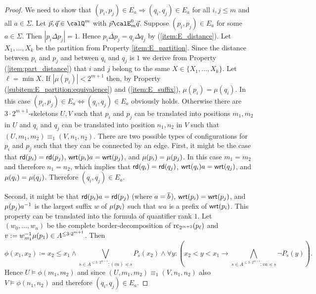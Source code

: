 \begin{proof}
	We need to show that $(p_i,p_j)\in E_a \Rightarrow (q_i,q_j)\in E_a$  for all $i,j\leq m$ and all $a\in \Sigma$.
	Let $\vec{p}, \vec{q} \in \Qx^m$ with $\vec{p} \calE^0_m \vec{q}$. Suppose  $(p_i,p_j) \in E_a$ for some $a\in\Sigma$. Then $|p_i\Delta p_j| = 1$. Hence $p_i\Delta p_j = q_i\Delta q_j$ by (\ref{item:E_distance}). 
	Let $X_1,\ldots, X_k$ be the partition from Property \ref{item:E_partition}. Since the distance between $p_i$ and $p_j$ and between $q_i$ and $q_j$ is $1$ we derive from Property (\ref{item:part_distance}) that $i$ and $j$ belong to the same 
	$X\in\{X_1,\ldots, X_k\}$. Let $\ell = \min X$.
	If $|\mu(p_i)| < 2^{m  +1}$ then, by Property (\ref{subitem:E_partition:equivalence}) and (\ref{item:E_suffix}), $\mu(p_i) = \mu(q_i)$. In this case $(p_i, p_j) \in E_a \Leftrightarrow (q_i,q_j) \in E_a$  obviously holds.
	Otherwise there are $3\cdot2^{m + 1}$-skeletons $U,V$ such that 
	$p_i$ and $p_j$ can be translated into positions $m_1, m_2$ in $U$ and $q_i$ and $q_j$ can be translated into position $n_1,n_2$ in $V$ such that $(U,m_1,m_2) \equiv_1 (V,n_1,n_2)$. 
	There are two possible types of configurations for $p_i$ and $p_j$ such that they can be connected by an edge. First, it might be the case  that $\mathsf{rd}(p_i) = \mathsf{rd}(p_j)$,
	$\mathsf{wrt}(p_i)a = \mathsf{wrt}(p_j)$, and $\mu(p_i) = \mu(p_j)$. In this case $m_1=m_2$ and therefore $n_1=n_2$, which implies that $\mathsf{rd}(q_i) = \mathsf{rd}(q_j)$,
	$\mathsf{wrt}(q_i)a = \mathsf{wrt}(q_j)$, and $\mu(q_i) = \mu(q_j)$. Therefore $(q_i,q_j) \in E_a$.
	
	Second, it might be that $\mathsf{rd}(p_i)a = \mathsf{rd}(p_j)$ (where $a=\overline{b}$),
	$\mathsf{wrt}(p_i) = \mathsf{wrt}(p_j)$, and $\mu(p_j)a^{-1}$ is the largest suffix $w$ of $\mu(p_i)$ such that $wa$ is a prefix of $\mathsf{wrt}(p_i)$.  This property can be translated into the formula of quantifier rank $1$. Let $(w_0,\ldots, w_n)$ be the complete border-decomposition of $\operatorname{rc}_{2^{m+2}}(p_\ell)$ and $v:= w_{m_1}^{-1}\mu(p_1) \in A^{\leq 3\cdot 2^{m+1}}$. Then
	\[\phi(x_1, x_2) \coloneq x_2 \leq x_1 \land \bigvee_{s\in A^{\leq 3\cdot 2^{m+1}} : (va)\preceq s} P_s(x_2) \land  \forall y: \left(x_2 < y < x_1 \to \bigwedge_{s\in A^{\leq 3\cdot 2^{m+1}} : va\preceq s} \lnot P_s(y)\right) . \]
	 Hence $U \models \phi(m_1,m_2)$  and since $(U,m_1,m_2) \equiv_1 (V, n_1,n_2)$ also $V \models \phi(n_1, n_2)$ and therefore $(q_i,q_j)\in E_a$.
\end{proof}


